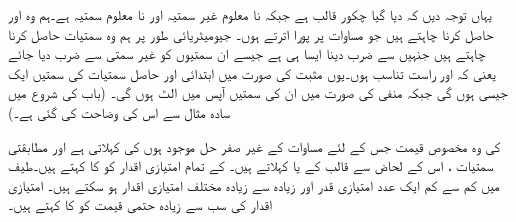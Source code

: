 یہاں توجہ دیں کہ  دیا گیا چکور قالب ہے جبکہ  نا معلوم غیر سمتیہ اور  نا معلوم سمتیہ ہے۔ہم وہ  اور  حاصل کرنا چاہتے ہیں جو مساوات  پر پورا اترتے ہوں۔ جیومیٹریائی طور پر ہم وہ سمتیات  حاصل کرنا چاہتے ہیں جنہیں  سے ضرب دینا ایسا ہی ہے جیسے ان سمتیوں کو غیر سمتی  سے ضرب دیا جائے یعنی کہ  اور  راست تناسب ہوں۔یوں مثبت  کی صورت میں ابتدائی اور حاصل سمتیات کی سمتیں ایک جیسی ہوں گی جبکہ منفی  کی صورت میں ان کی سمتیں آپس میں الٹ ہوں گی۔ (باب کی شروع میں سادہ مثال سے اس کی وضاحت کی گئی ہے۔)

  کی وہ مخصوص قیمت جس کے لئے مساوات  کے غیر صفر  حل موجود ہوں   کی  کہلاتی ہے اور مطابقتی سمتیات ،  اس  کے لحاض سے قالب  کے   یا  کہلاتے ہیں۔ کے تمام امتیازی اقدار کو  کا  کہتے ہیں۔طیف میں کم سے کم ایک عدد امتیازی قدر اور زیادہ سے زیادہ  مختلف امتیازی اقدار ہو سکتے ہیں۔ امتیازی اقدار کی سب سے  زیادہ حتمی قیمت کو  کا  کہتے ہیں۔

